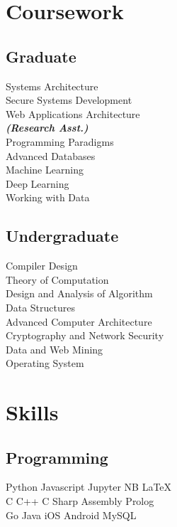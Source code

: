 \documentclass[]{deedy-resume-openfont}
\begin{document}
\begin{minipage}[t]{0.33\textwidth}

\section{Coursework}
\subsection{Graduate}
Systems Architecture \\
Secure Systems Development \\
Web Applications Architecture \\
{\footnotesize \textit{\textbf{(Research Asst.) }}} \\
Programming Paradigms \\
Advanced Databases \\
Machine Learning \\
Deep Learning \\
Working with Data \\
\sectionsep

\subsection{Undergraduate}
Compiler Design \\ 
Theory of Computation  \\
Design and Analysis of Algorithm \\
Data Structures \\
Advanced Computer Architecture \\
Cryptography and Network Security \\
Data and Web Mining \\
Operating System \\


\section{Skills}
\subsection{Programming}
Python \textbullet{} Javascript \textbullet{} Jupyter NB \textbullet{} \LaTeX\ \\ 
C \textbullet{} C++ \textbullet{} C Sharp  \textbullet{} Assembly  \textbullet{} Prolog\\
Go \textbullet{}   Java \textbullet{} iOS \textbullet{} Android \textbullet{} MySQL
\sectionsep

%
%

\end{minipage} 
\end{document}
